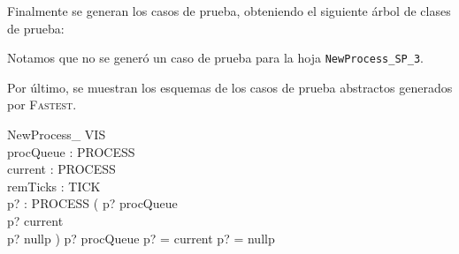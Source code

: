 \documentclass{article}
\begin{document}
\begin{minipage}{5cm}
\end{minipage}

Finalmente se generan los casos de prueba, obteniendo el siguiente árbol de clases de prueba:

\begin{minipage}{7cm}
\end{minipage}

Notamos que no se generó un caso de prueba para la hoja \verb|NewProcess_SP_3|.

Por último, se muestran los esquemas de los casos de prueba abstractos generados por \textsc{Fastest}.


\begin{schema}{NewProcess\_ VIS}\\
procQueue : \seq PROCESS \\
current : PROCESS \\
remTicks : TICK \\
p? : PROCESS 
\where
( p? \notin \ran procQueue \\
p? \neq current \\
p? \neq nullp ) \lor p? \in \ran procQueue \lor p? = current \lor p? = nullp
\end{schema}
\end{document}
